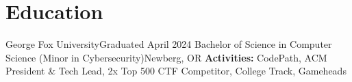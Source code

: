 \section{Education}
  \resumeSubHeadingListStart
    \resumeEducationSubheading
        {George Fox University}{Graduated April 2024}
        {Bachelor of Science in Computer Science (Minor in Cybersecurity)}{Newberg, OR}
        {\textbf{Activities:} CodePath, ACM President \& Tech Lead, 2x Top 500 CTF Competitor, College Track, Gameheads}
  \resumeSubHeadingListEnd


